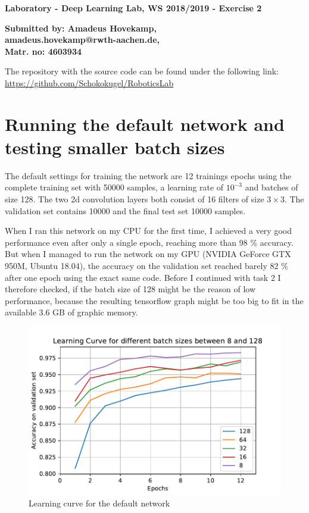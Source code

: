 \documentclass[
        a4paper,
        10pt,
        parskip = full,    %
    ]{scrartcl}
\begin{document}
\textbf{\large{Laboratory - Deep Learning Lab, WS 2018/2019 - Exercise 2}}

\textbf{\large{Submitted by: Amadeus Hovekamp,\\
amadeus.hovekamp@rwth-aachen.de,\\
Matr. no: 4603934}}

The repository with the source code can be found under the following link:\\
\href{https://github.com/Schokokugel/RoboticsLab}
     {https://github.com/Schokokugel/RoboticsLab}

\section{Running the default network and testing smaller batch sizes}
The default settings for training the network are 12 trainings epochs using the
complete training set with 50000 samples, a learning rate of $10^{-3}$ and
batches of size 128. The two 2d convolution layers both consist of 16 filters of
size $3 \times 3$. The validation set contains 10000 and the final test set
10000 samples.

When I ran this network on my CPU for the first time, I achieved a very good
performance even after only a single epoch, reaching more than 98 \% accuracy.
But when I managed to run the network on my GPU (NVIDIA GeForce GTX 950M, Ubuntu
18.04), the accuracy on the validation set reached barely 82 \% after one epoch
using the exact same code. Before I continued with task 2 I therefore checked,
if the batch size of 128 might be the reason of low performance, because the
resulting tensorflow graph might be too big to fit in the available 3.6 GB of
graphic memory.

\begin{figure}[H]
	\includegraphics{../images/Learning_curve_for_Batch_Sizes.pdf}
	\caption{Learning curve for the default network}
  \label{BatchSize}
\end{figure}
\end{document}

